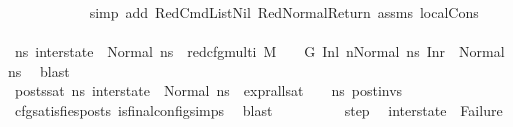 \begin{isabellebody}
\ \ \ \ \ \ \ \ \ \ \isamarkupfalse%
\ {\isacharparenleft}{\kern0pt}simp\ add{\isacharcolon}{\kern0pt}\ RedCmdListNil\ RedNormalReturn\ assms{\isacharparenleft}{\kern0pt}{}{\isacharminus}{\kern0pt}{}{\isacharparenright}{\kern0pt}\ local{\isachardot}{\kern0pt}Cons{\isacharparenright}{\kern0pt}\isanewline
\isanewline
\ \ \ \ \ \ \ \ \isamarkupfalse%
\ {\isachardoublequoteopen}{\isacharparenleft}{\kern0pt}{\isasymforall}ns{}{\isacharprime}{\kern0pt}{\isachardot}{\kern0pt}\ inter{\isacharunderscore}{\kern0pt}state\ {\isacharequal}{\kern0pt}\ Normal\ ns{}{\isacharprime}{\kern0pt}\ {\isasymlongrightarrow}\ red{\isacharunderscore}{\kern0pt}cfg{\isacharunderscore}{\kern0pt}multi\ M\ {\isasymLambda}\ {\isasymGamma}\ {\isasymOmega}\ G\ {\isacharparenleft}{\kern0pt}{\isacharparenleft}{\kern0pt}Inl\ n{\isacharparenright}{\kern0pt}{\isacharcomma}{\kern0pt}{\isacharparenleft}{\kern0pt}Normal\ ns{}{\isacharparenright}{\kern0pt}{\isacharparenright}{\kern0pt}\ {\isacharparenleft}{\kern0pt}Inr\ {\isacharparenleft}{\kern0pt}{\isacharparenright}{\kern0pt}{\isacharcomma}{\kern0pt}\ Normal\ ns{}{\isacharprime}{\kern0pt}{\isacharparenright}{\kern0pt}{\isacharparenright}{\kern0pt}{\isachardoublequoteclose}\ \isamarkupfalse%
\ blast\isanewline
\ \ \ \ \ \ \ \ \isamarkupfalse%
\ posts{\isacharunderscore}{\kern0pt}sat{\isacharcolon}{\kern0pt}\ {\isachardoublequoteopen}{\isasymforall}ns{}{\isacharprime}{\kern0pt}{\isachardot}{\kern0pt}\ inter{\isacharunderscore}{\kern0pt}state\ {\isacharequal}{\kern0pt}\ Normal\ ns{}{\isacharprime}{\kern0pt}\ {\isasymlongrightarrow}\ {\isacharparenleft}{\kern0pt}expr{\isacharunderscore}{\kern0pt}all{\isacharunderscore}{\kern0pt}sat\ {\isasymLambda}\ {\isasymGamma}\ {\isasymOmega}\ ns{}{\isacharprime}{\kern0pt}{\isacharparenright}{\kern0pt}\ post{\isacharunderscore}{\kern0pt}invs{\isachardoublequoteclose}\ \isanewline
\ \ \ \ \ \ \ \ \ \ \isamarkupfalse%
\ cfg{\isacharunderscore}{\kern0pt}satisfies{\isacharunderscore}{\kern0pt}posts\ is{\isacharunderscore}{\kern0pt}final{\isacharunderscore}{\kern0pt}config{\isachardot}{\kern0pt}simps{\isacharparenleft}{\kern0pt}{}{\isacharparenright}{\kern0pt}\ \isamarkupfalse%
\ blast\isanewline
\isanewline
\ \ \ \ \ \ \ \ \isamarkupfalse%
\ step\ \isamarkupfalse%
\ {\isachardoublequoteopen}inter{\isacharunderscore}{\kern0pt}state\ {\isasymnoteq}\ Failure{\isachardoublequoteclose}\ \isamarkupfalse%

\end{isabellebody}

